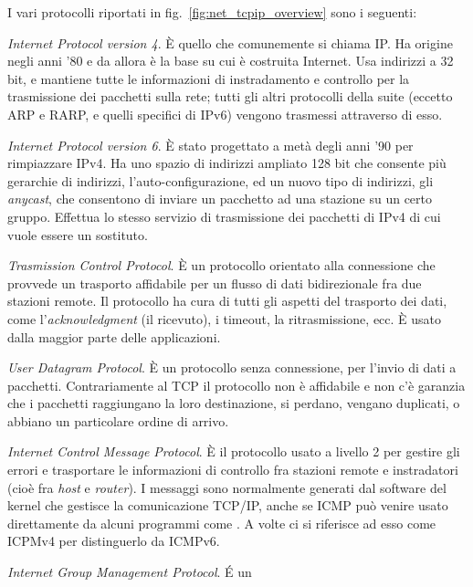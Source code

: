 I vari protocolli riportati in fig.~\ref{fig:net_tcpip_overview} sono i
seguenti:
\begin{basedescript}{\desclabelwidth{1.7cm}\desclabelstyle{\nextlinelabel}}
\item[\textsl{IPv4}] \textit{Internet Protocol version 4}. È quello che
  comunemente si chiama IP. Ha origine negli anni '80 e da allora è la base su
  cui è costruita Internet. Usa indirizzi a 32 bit, e mantiene tutte le
  informazioni di instradamento e controllo per la trasmissione dei pacchetti
  sulla rete; tutti gli altri protocolli della suite (eccetto ARP e RARP, e
  quelli specifici di IPv6) vengono trasmessi attraverso di esso.
\item[\textsl{IPv6}] \textit{Internet Protocol version 6}. È stato progettato
  a metà degli anni '90 per rimpiazzare IPv4. Ha uno spazio di indirizzi
  ampliato 128 bit che consente più gerarchie di indirizzi,
  l'auto-configurazione, ed un nuovo tipo di indirizzi, gli \textit{anycast},
  che consentono di inviare un pacchetto ad una stazione su un certo gruppo.
  Effettua lo stesso servizio di trasmissione dei pacchetti di IPv4 di cui
  vuole essere un sostituto.
\item[\textsl{TCP}] \textit{Trasmission Control Protocol}. È un protocollo
  orientato alla connessione che provvede un trasporto affidabile per un
  flusso di dati bidirezionale fra due stazioni remote. Il protocollo ha cura
  di tutti gli aspetti del trasporto dei dati, come l'\textit{acknowledgment}
  (il ricevuto), i timeout, la ritrasmissione, ecc. È usato dalla maggior
  parte delle applicazioni.
\item[\textsl{UDP}] \textit{User Datagram Protocol}. È un protocollo senza
  connessione, per l'invio di dati a pacchetti. Contrariamente al TCP il
  protocollo non è affidabile e non c'è garanzia che i pacchetti raggiungano
  la loro destinazione, si perdano, vengano duplicati, o abbiano un
  particolare ordine di arrivo.
\item[\textsl{ICMP}] \textit{Internet Control Message Protocol}. È il
  protocollo usato a livello 2 per gestire gli errori e trasportare le
  informazioni di controllo fra stazioni remote e instradatori (cioè fra
  \textit{host} e \textit{router}). I messaggi sono normalmente generati dal
  software del kernel che gestisce la comunicazione TCP/IP, anche se ICMP può
  venire usato direttamente da alcuni programmi come . A volte ci
  si riferisce ad esso come ICPMv4 per distinguerlo da ICMPv6.
\item[\textsl{IGMP}] \textit{Internet Group Management Protocol}. É un

\end{basedescript}
